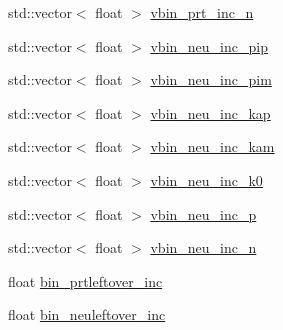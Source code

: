 \begin{DoxyCompactItemize}
std\-::vector$<$ float $>$ \hyperlink{class_neutrino_flux_reweight_1_1_thin_targetnucleon_a_reweighter_a2f5a030bd0654de8d5d62294ca7441d9}{vbin\-\_\-prt\-\_\-inc\-\_\-n}
\item 
std\-::vector$<$ float $>$ \hyperlink{class_neutrino_flux_reweight_1_1_thin_targetnucleon_a_reweighter_ae47fb7b28a9a98bcf896bc93b96c371d}{vbin\-\_\-neu\-\_\-inc\-\_\-pip}
\item 
std\-::vector$<$ float $>$ \hyperlink{class_neutrino_flux_reweight_1_1_thin_targetnucleon_a_reweighter_a7643f9d1002efdd8030f0a2016cfd5f4}{vbin\-\_\-neu\-\_\-inc\-\_\-pim}
\item 
std\-::vector$<$ float $>$ \hyperlink{class_neutrino_flux_reweight_1_1_thin_targetnucleon_a_reweighter_a1ec58cec8bcce352e693785f7f7c7904}{vbin\-\_\-neu\-\_\-inc\-\_\-kap}
\item 
std\-::vector$<$ float $>$ \hyperlink{class_neutrino_flux_reweight_1_1_thin_targetnucleon_a_reweighter_a7c77ff20d31c4d95447e593726d267b0}{vbin\-\_\-neu\-\_\-inc\-\_\-kam}
\item 
std\-::vector$<$ float $>$ \hyperlink{class_neutrino_flux_reweight_1_1_thin_targetnucleon_a_reweighter_adaee6b1fb0e48aa2e40806ac78937b94}{vbin\-\_\-neu\-\_\-inc\-\_\-k0}
\item 
std\-::vector$<$ float $>$ \hyperlink{class_neutrino_flux_reweight_1_1_thin_targetnucleon_a_reweighter_a73c1e6b171db3486462eb3c0e6899396}{vbin\-\_\-neu\-\_\-inc\-\_\-p}
\item 
std\-::vector$<$ float $>$ \hyperlink{class_neutrino_flux_reweight_1_1_thin_targetnucleon_a_reweighter_a270e10a3f2bc7ece4a7bf35e88ca5061}{vbin\-\_\-neu\-\_\-inc\-\_\-n}
\item 
float \hyperlink{class_neutrino_flux_reweight_1_1_thin_targetnucleon_a_reweighter_a70d7724eabbb284c4a6c145d8abd9dd4}{bin\-\_\-prtleftover\-\_\-inc}
\item 
float \hyperlink{class_neutrino_flux_reweight_1_1_thin_targetnucleon_a_reweighter_a6c16f1fc945e36479f96e918392710f3}{bin\-\_\-neuleftover\-\_\-inc}
\end{DoxyCompactItemize}
